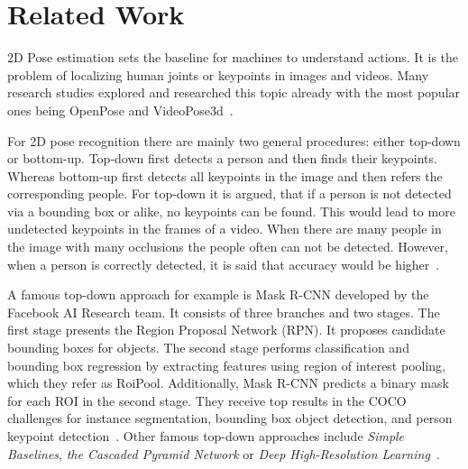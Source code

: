 \section{Related Work}

\begin{flushleft}
    2D Pose estimation sets the baseline for machines to understand actions.
    It is the problem of localizing human joints or keypoints in images and videos.
    Many research studies explored and researched this topic already with the most popular ones being OpenPose
    and VideoPose3d~\cite{openpose, videopose3d}.
\end{flushleft}
\begin{flushleft}
    For 2D pose recognition there are mainly two general procedures: either top-down or bottom-up.
    Top-down first detects a person and then finds their keypoints.
    Whereas bottom-up first detects all keypoints in the image and then refers the corresponding people.
    For top-down it is argued, that if a person is not detected via a bounding box or alike, no keypoints can be
    found.
    This would lead to more undetected keypoints in the frames of a video.
    When there are many people in the image with many occlusions the people often can not be detected.
    However, when a person is correctly detected, it is said that accuracy would be higher~\cite{synergetic}.
\end{flushleft}
\begin{flushleft}
    A famous top-down approach for example is Mask R-CNN developed by the Facebook AI Research team. It consists
    of three branches and two stages.
    The first stage presents the Region Proposal Network (RPN). It proposes candidate bounding boxes for objects.
    The second stage performs classification and bounding box regression by extracting features using region of
    interest pooling, which they refer as RoiPool.
    Additionally, Mask R-CNN predicts a binary mask for each ROI in the second stage.
    They receive top results in the COCO challenges for instance segmentation, bounding box object detection, and
    person keypoint detection~\cite{maskrcnn}.
    Other famous top-down approaches include \textit{Simple Baselines}, \textit{the Cascaded Pyramid Network} or
    \textit{Deep High-Resolution Learning}~\cite{simplebaselines,pyramidnetwork, highres}.
\end{flushleft}

